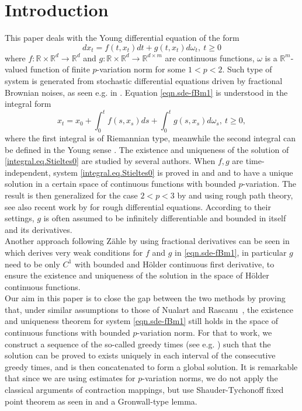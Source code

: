 \documentclass[10pt]{article}
\numberwithin{equation}{section} %
\newcommand{\R}{\ensuremath{\mathbb{R}}}
\begin{document}
\section{Introduction}
This paper deals with the Young differential equation of the form
\begin{equation}\label{eqn.sde-fBm1}
dx_t = f(t,x_t)dt+g(t,x_t)d\omega_t, \ t\geq 0
\end{equation}
where $f: \R\times \R^d \to \R^d$ and $g: \R \times \R^d \to \R^{d \times m}$ are continuous functions, $\omega$ is a $\R^m$-valued function of  finite $p$-variation norm for some $1<p<2$. Such type of system is generated from  stochastic differential equations driven by fractional Brownian noises, as seen e.g. in \cite{mandelbrot}. Equation \eqref{eqn.sde-fBm1} is understood in the integral form
\begin{equation}\label{integral.eq.Stieltes0}
x_t=x_{0} +\int_0^t f(s,x_s) ds + \int_0^tg(s,x_s)d\omega_s,\  t\geq 0,
\end{equation}
where the first integral is of Riemannian type, meanwhile the second integral can be defined in the Young sense \cite{young}. The existence and uniqueness of the solution of \eqref{integral.eq.Stieltes0} are studied by several authors. When  $f,g$ are time-independent, system \eqref{integral.eq.Stieltes0} is proved in \cite{young} and \cite{ruzmaikina} and \cite{lyons94} to have a unique solution in a certain space of continuous functions with bounded  $p$-variation. The result is then generalized for the case $2<p<3$ by \cite{friz} and \cite{lyonsqian} using rough path theory, see also recent work by \cite{riedelscheutzow} for rough differential equations. According to their settings, $g$ is often assumed to be infinitely differentiable and bounded in itself and its derivatives.\\
Another approach following Z\"ahle \cite{zaehle} by using fractional derivatives can be seen in \cite{nualart3} which derives very weak conditions for $f$ and $g$ in \eqref{eqn.sde-fBm1}, in particular $g$ need to be only $C^1$ with bounded and H\"older continuous first derivative, to ensure the existence and uniqueness of the solution in the space of H\"older continuous functions. \\
Our aim in this paper is to close the gap between the two methods by proving that, under similar assumptions to those of Nualart and Rascanu~\cite{nualart3}, the existence and uniqueness theorem for system \eqref{eqn.sde-fBm1} still holds in the space of continuous functions with bounded $p$-variation norm. For that to work, we construct a sequence of the so-called greedy times (see e.g. \cite{lyonsetal}) such that the solution can be proved to exists uniquely in each interval of the consecutive greedy times, and is then concatenated to form a global solution. It is remarkable that since we are using estimates for $p$-variation norms, we do not apply the classical arguments of contraction mappings, but use Shauder-Tychonoff fixed point theorem as seen in \cite{lyons94} and a Gronwall-type lemma. \\
\end{document}
